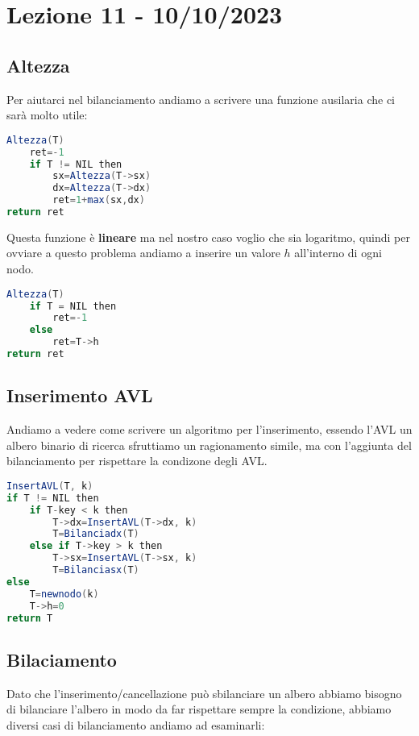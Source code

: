 \section{Lezione 11 - 10/10/2023}

\subsection{Altezza}
Per aiutarci nel bilanciamento andiamo a scrivere una funzione ausilaria che ci sarà molto utile:
\begin{lstlisting}[language=Java]
Altezza(T)
    ret=-1
    if T != NIL then
        sx=Altezza(T->sx)
        dx=Altezza(T->dx)
        ret=1+max(sx,dx)
return ret
\end{lstlisting}
Questa funzione è \textbf{lineare} ma nel nostro caso voglio che sia logaritmo, quindi per ovviare a questo problema andiamo a inserire un valore $h$ all'interno di ogni nodo.

\begin{lstlisting}[language=Java]
Altezza(T)
    if T = NIL then
        ret=-1
    else
        ret=T->h
return ret
\end{lstlisting}

\subsection{Inserimento AVL}
Andiamo a vedere come scrivere un algoritmo per l'inserimento, essendo l'AVL un albero binario di ricerca sfruttiamo un ragionamento simile, ma con l'aggiunta del bilanciamento per rispettare la condizone degli AVL.
\begin{lstlisting}[language=Java]
InsertAVL(T, k)
if T != NIL then
    if T-key < k then
        T->dx=InsertAVL(T->dx, k)
        T=Bilanciadx(T)
    else if T->key > k then
        T->sx=InsertAVL(T->sx, k)
        T=Bilanciasx(T)
else 
    T=newnodo(k)
    T->h=0
return T
\end{lstlisting}

\subsection{Bilaciamento}
Dato che l'inserimento/cancellazione può sbilanciare un albero abbiamo bisogno di bilanciare l'albero in modo da far rispettare sempre la condizione, abbiamo diversi casi di bilanciamento andiamo ad esaminarli:

